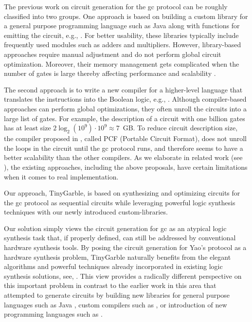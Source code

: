 The previous work on circuit generation for the \acrshort{gc} protocol can be roughly classified into two groups.
One approach is based on building a custom library for a general purpose programming language such as Java along with functions for emitting the circuit, e.g., \cite{huang2011faster,malka2011vmcrypt,henecka2013faster}.
For better usability, these libraries typically include frequently used modules such as adders and multipliers.
However, library-based approaches require manual adjustment and do not perform global circuit optimization.
Moreover, their memory management gets complicated when the number of gates is large thereby affecting performance and scalability \cite{henecka2013faster}.

The second approach is to write a new compiler for a higher-level language that translates the instructions into the Boolean logic, e.g., \cite{malkhi2004fairplay,kreuter2012billion,kreuter2013pcf,franz2014cbmc}.
Although compiler-based approaches can perform global optimizations, they often unroll the circuits into a large list of gates.
For example, the description of a circuit with one billion gates has at least size $2 \log_2 (10^9) \cdot 10^{9} \approx 7$~GB.
To reduce circuit description size, the compiler proposed in \cite{kreuter2013pcf}, called PCF (Portable Circuit Format), does not unroll the loops in the circuit until the \acrshort{gc} protocol runs, and therefore seems to have a better scalability than the other compilers.
As we elaborate in related work (see ), the existing approaches, including the above proposals, have certain limitations when it comes to real implementation.

Our approach, TinyGarble, is based on synthesizing and optimizing circuits for the \acrshort{gc} protocol as sequential circuits while leveraging powerful logic synthesis techniques with our newly introduced custom-libraries.

Our solution simply views the circuit generation for \acrshort{gc} as an atypical logic synthesis task that, if properly defined, can still be addressed by conventional hardware synthesis tools.
By posing the circuit generation for Yao's protocol as a hardware synthesis problem, TinyGarble naturally benefits from the elegant algorithms and powerful techniques already incorporated in existing logic synthesis solutions, see, \cite{sentovich1992sis,micheli1994synthesis,devadas1994logic,brayton1987mis}.
This view provides a radically different perspective on this important problem in contrast to the earlier work in this area that attempted to generate circuits by building new libraries for general purpose languages such as Java \cite{huang2011faster,malka2011vmcrypt}, custom compilers such as \cite{kreuter2013pcf,franz2014cbmc}, or introduction of new programming languages such as \cite{malkhi2004fairplay,rastogi2014wysteria}.

